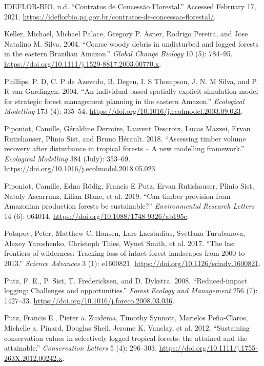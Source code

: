 \documentclass[
]{article}
\begin{document}
\leavevmode\hypertarget{ref-IDEFLOR2020}{}%
IDEFLOR-BIO. n.d. ``Contratos de Concessão Florestal.'' Accessed February 17, 2021. \url{https://ideflorbio.pa.gov.br/contratos-de-concessao-florestal/}.

\leavevmode\hypertarget{ref-Keller2004}{}%
Keller, Michael, Michael Palace, Gregory P. Asner, Rodrigo Pereira, and Jose Natalino M. Silva. 2004. ``Coarse woody debris in undisturbed and logged forests in the eastern Brazilian Amazon.'' \emph{Global Change Biology} 10 (5): 784--95. \url{https://doi.org/10.1111/j.1529-8817.2003.00770.x}.

\leavevmode\hypertarget{ref-Phillips2004}{}%
Phillips, P. D, C. P de Azevedo, B. Degen, I. S Thompson, J. N. M Silva, and P. R van Gardingen. 2004. ``An individual-based spatially explicit simulation model for strategic forest management planning in the eastern Amazon.'' \emph{Ecological Modelling} 173 (4): 335--54. \url{https://doi.org/10.1016/j.ecolmodel.2003.09.023}.

\leavevmode\hypertarget{ref-Piponiot2018}{}%
Piponiot, Camille, Géraldine Derroire, Laurent Descroix, Lucas Mazzei, Ervan Rutishauser, Plinio Sist, and Bruno Hérault. 2018. ``Assessing timber volume recovery after disturbance in tropical forests -- A new modelling framework.'' \emph{Ecological Modelling} 384 (July): 353--69. \url{https://doi.org/10.1016/j.ecolmodel.2018.05.023}.

\leavevmode\hypertarget{ref-Piponiot2019}{}%
Piponiot, Camille, Edna Rödig, Francis E Putz, Ervan Rutishauser, Plinio Sist, Nataly Ascarrunz, Lilian Blanc, et al. 2019. ``Can timber provision from Amazonian production forests be sustainable?'' \emph{Environmental Research Letters} 14 (6): 064014. \url{https://doi.org/10.1088/1748-9326/ab195e}.

\leavevmode\hypertarget{ref-Potapov2017}{}%
Potapov, Peter, Matthew C. Hansen, Lars Laestadius, Svetlana Turubanova, Alexey Yaroshenko, Christoph Thies, Wynet Smith, et al. 2017. ``The last frontiers of wilderness: Tracking loss of intact forest landscapes from 2000 to 2013.'' \emph{Science Advances} 3 (1): e1600821. \url{https://doi.org/10.1126/sciadv.1600821}.

\leavevmode\hypertarget{ref-Putz2008}{}%
Putz, F. E., P. Sist, T. Fredericksen, and D. Dykstra. 2008. ``Reduced-impact logging: Challenges and opportunities.'' \emph{Forest Ecology and Management} 256 (7): 1427--33. \url{https://doi.org/10.1016/j.foreco.2008.03.036}.

\leavevmode\hypertarget{ref-Putz2012}{}%
Putz, Francis E., Pieter a. Zuidema, Timothy Synnott, Marielos Peña-Claros, Michelle a. Pinard, Douglas Sheil, Jerome K. Vanclay, et al. 2012. ``Sustaining conservation values in selectively logged tropical forests: the attained and the attainable.'' \emph{Conservation Letters} 5 (4): 296--303. \url{https://doi.org/10.1111/j.1755-263X.2012.00242.x}.
\end{document}
